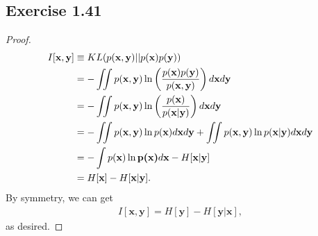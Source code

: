\documentclass[11pt]{article}
\theoremstyle{definition}
\begin{document}
\subsection{Exercise 1.41}
\begin{proof}
\begin{align*}
I[\textbf{x},\textbf{y}] &\equiv KL(p(\textbf{x},\textbf{y})||p(\textbf{x})p(\textbf{y})) \\
&= -\iint p(\textbf{x},\textbf{y})\ln\left(\frac{p(\textbf{x})p(\textbf{y})}{p(\textbf{x},\textbf{y})}\right)d\textbf{x}d\textbf{y} \\
&= -\iint p(\textbf{x},\textbf{y})\ln\left(\frac{p(\textbf{x})}{p(\textbf{x}|\textbf{y})}\right)d\textbf{x}d\textbf{y} \\
&= -\iint p(\textbf{x},\textbf{y})\ln p(\textbf{x})d\textbf{x}d\textbf{y} + \iint p(\textbf{x},\textbf{y})\ln p(\textbf{x}|\textbf{y})d\textbf{x}d\textbf{y} \\
&= -\int p(\textbf{x})\ln \textbf{p(\textbf{x})}d\textbf{x} - H[\textbf{x}|\textbf{y}] \\
&= H[\textbf{x}] - H[\textbf{x}|\textbf{y}].
\end{align*}
By symmetry, we can get
\begin{align*}
I[\textbf{x},\textbf{y}] = H[\textbf{y}] - H[\textbf{y}|\textbf{x}],
\end{align*}
as desired.
\end{proof}
\end{document}
